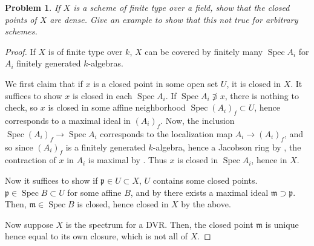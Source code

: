 \documentclass[12pt,letterpaper]{article}
\newtheorem{problem}{Problem}[section]
\theoremstyle{definition}
\theoremstyle{remark}
\numberwithin{equation}{section}
\numberwithin{figure}{problem}
\DeclareMathOperator{\Spec}{Spec}
\begin{document}
\begin{problem}
  If $X$ is a scheme of finite type over a field, show that the closed points of $X$ are dense. Give an example to show that this not true for arbitrary schemes.
\end{problem}
\begin{proof}
  If $X$ is of finite type over $k$, $X$ can be covered by finitely many $\Spec A_i$ for $A_i$ finitely generated $k$-algebras.
  \par We first claim that if $x$ is a closed point in some open set $U$, it is closed in $X$. It suffices to show $x$ is closed in each $\Spec A_i$. If $\Spec A_i \not\ni x$, there is nothing to check, so $x$ is closed in some affine neighborhood $\Spec (A_i)_f \subset U$, hence corresponds to a maximal ideal in $(A_i)_f$. Now, the inclusion $\Spec (A_i)_f \to \Spec A_i$ corresponds to the localization map $A_i \to (A_i)_f$, and so since $(A_i)_f$ is a finitely generated $k$-algebra, hence a Jacobson ring by \cite[Ex.~5.24]{AM69}, the contraction of $x$ in $A_i$ is maximal by \cite[Thm.~4.19]{Eis95}. Thus $x$ is closed in $\Spec A_i$, hence in $X$.
  \par Now it suffices to show if $\mathfrak{p} \in U \subset X$, $U$ contains some closed points. $\mathfrak{p} \in \Spec B \subset U$ for some affine $B$, and by \cite[Cor.~1.4]{AM69} there exists a maximal ideal $\mathfrak{m} \supset \mathfrak{p}$. Then, $\mathfrak{m} \in \Spec B$ is closed, hence closed in $X$ by the above.
  \par Now suppose $X$ is the spectrum for a DVR. Then, the closed point $\mathfrak{m}$ is unique hence equal to its own closure, which is not all of $X$.
\end{proof}
\end{document}
